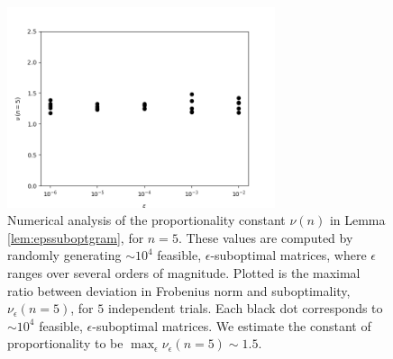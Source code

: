 \begin{figure}
\begin{center}
\includegraphics[width=0.7\textwidth]{images/propconst.png}
\end{center}
\caption{Numerical analysis of the proportionality constant $\nu(n)$ in Lemma \ref{lem:epssuboptgram}, for $n=5$. These values are computed by randomly generating $\sim 10^4$ feasible, $\epsilon$-suboptimal matrices, where $\epsilon$ ranges over several orders of magnitude. Plotted is the maximal ratio between deviation in Frobenius norm and suboptimality, $\nu_{\epsilon}(n=5)$, for $5$ independent trials. Each black dot corresponds to $\sim 10^4$ feasible, $\epsilon$-suboptimal matrices. We estimate the constant of proportionality to be $\max_{\epsilon} \nu_{\epsilon}(n=5)\sim 1.5$.}
\label{fig:propconst}
\end{figure}

